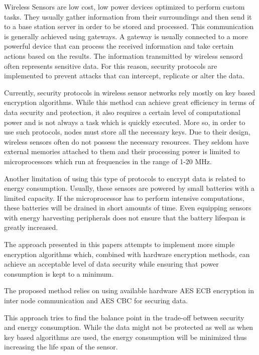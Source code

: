 Wireless Sensors are low cost, low power devices optimized to perform custom tasks. They usually
gather information from their surroundings and then send it to a base station server in order
to be stored and processed. This communication is generally achieved using gateways. A
gateway is usually connected to a more powerful device that can process the received information and take certain actions based on the results. 
The information transmitted by wireless sensord often represents sensitive data. For this reason, security protocols are implemented to 
prevent attacks that can intercept, replicate or alter the data.

Currently, security protocols in wireless sensor networks rely mostly on key based encryption algorithms. While this method can achieve 
great efficiency in terms of data security and protection, it also requires a certain level of computational power and is not 
always a task which is quickly executed. More so, in order to use such protocols, nodes must store all the necessary keys.
Due to their design, wireless sensors often do not possess the necessary resources. They seldom have external memories attached 
to them and their processing power is limited to microprocessors which run at frequencies in the range of 1-20 MHz.

Another limitation of using this type of protocols to encrypt data is related to energy consumption. Usually, these sensors are 
powered by small batteries with a limited capacity. If the microprocessor has to perform intensive computations, these batteries 
will be drained in short amounts of time. Even equipping sensors with energy harvesting peripherals does not ensure that 
the battery lifespan is greatly increased.

The approach presented in this papers attempts to implement more simple encryption algorithms which, combined with hardware 
encryption methods, can achieve an acceptable level of data security while ensuring that power consumption is kept to a minimum.

The proposed method relies on using available hardware AES ECB encryption in inter node
communication and AES CBC for securing data.

This approach tries to find the balance point in the trade-off between security and energy consumption. While the data might not be 
protected as well as when key based algorithms are used, the energy consumption will be minimized thus increasing the life span of the sensor.
